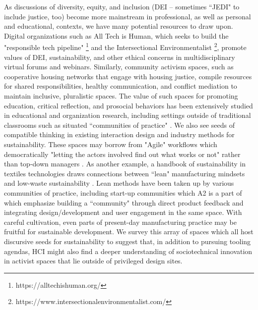 As discussions of diversity, equity, and inclusion (DEI -- sometimes ``JEDI" to include justice, too) become more mainstream in professional, as well as personal and educational, contexts, we have many potential resources to draw upon. Digital organizations such as All Tech is Human, which seeks to build the "responsible tech pipeline" \footnote{https://alltechishuman.org/} and the Intersectional Environmentalist \footnote{https://www.intersectionalenvironmentalist.com/}, promote values of DEI, sustainability, and other ethical concerns in multidisciplinary virtual forums and webinars. Similarly, community activism spaces, such as cooperative housing networks that engage with housing justice, compile resources for shared responsibilities, healthy communication, and conflict mediation \cite{nahc_national_nodate, aorta_aorta_2021} to maintain inclusive, pluralistic spaces.
The value of such spaces for promoting education, critical reflection, and prosocial behaviors has been extensively studied in educational and organization research, including settings outside of traditional classrooms such as situated ``communities of practice" \cite{wenger_communities_1999}.
We also see seeds of compatible thinking in existing interaction design and industry methods for sustainability. These spaces may borrow from "Agile" workflows which democratically "letting the actors involved find out what works or not" rather than top-down managers \cite{rolland_scaling_2016}. As another example, a handbook of sustainability in textiles technologies draws connections between ``lean" manufacturing mindsets and low-waste sustainability \cite{muthu_textiles_2017}. Lean methods have been taken up by various communities of practice, including start-up communities which A2 is a part of \cite{ries_lean_2011} which emphasize building a ``community" through direct product feedback and integrating design/development and user engagement in the same space. With careful cultivation, even parts of present-day manufacturing practice may be fruitful for sustainable development. We survey this array of spaces which all host discursive seeds for sustainability to suggest that, in addition to pursuing tooling agendas, HCI might also find a deeper understanding of sociotechnical innovation in activist spaces that lie outside of privileged design sites.




